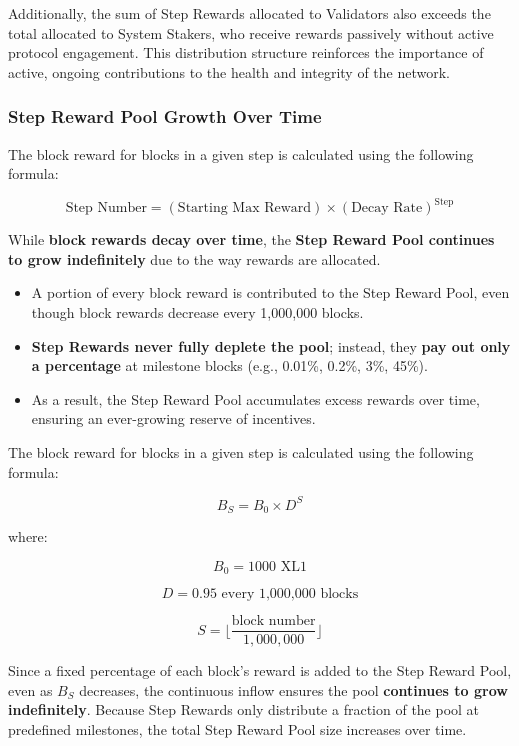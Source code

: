 \documentclass{article}
\begin{document}
Additionally, the sum of Step Rewards allocated to Validators also exceeds the
total allocated to System Stakers, who receive rewards passively without active
protocol engagement. This distribution structure reinforces the importance of
active, ongoing contributions to the health and integrity of the network.

\subsubsection{Step Reward Pool Growth Over Time}
The block reward for blocks in a given step is calculated using the following
formula:

\[
    \text{Step Number} = (\text{Starting Max Reward}) \times (\text{Decay Rate})^{\text{Step}}
\]

While \textbf{block rewards decay over time}, the \textbf{Step Reward Pool
    continues to grow indefinitely} due to the way rewards are allocated.

\begin{itemize}
    \item A portion of every block reward is contributed to the Step Reward Pool, even
          though block rewards decrease every 1,000,000 blocks.
    \item \textbf{Step Rewards never fully deplete the pool}; instead, they \textbf{pay out only a percentage} at milestone blocks (e.g., 0.01\%, 0.2\%, 3\%, 45\%).
    \item As a result, the Step Reward Pool accumulates excess rewards over time,
          ensuring an ever-growing reserve of incentives.
\end{itemize}

The block reward for blocks in a given step is calculated using the following
formula:

\[
    B_S = B_0 \times D^S
\]

where:

\[
    B_0 = 1000 \text{ XL1}
\]

\[
    D = 0.95 \text{ every 1,000,000 blocks}
\]

\[
    S = \lfloor \frac{\text{block number}}{1,000,000} \rfloor
\]

Since a fixed percentage of each block's reward is added to the Step Reward
Pool, even as \( B_S \) decreases, the continuous inflow ensures the pool
\textbf{continues to grow indefinitely}. Because Step Rewards only distribute a
fraction of the pool at predefined milestones, the total Step Reward Pool size
increases over time.
\end{document}

